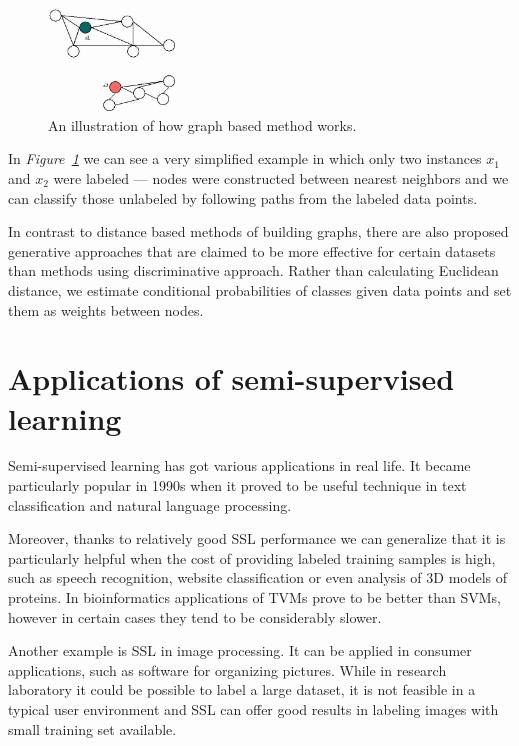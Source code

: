 \documentclass[12pt, a4paper, pdflatex]{report}
\begin{document}
\begin{figure}[htbp]
\centering
\includegraphics[width=0.3\textwidth]{graphics/graph-methods.jpg}
\begin{tiny}
\caption{ An illustration of how graph based method works.\label{fig:GraphMethodFig}}
\end{tiny}
\vspace{1cm}
\end{figure}

In \emph{Figure~\ref{fig:GraphMethodFig}} we can see a very simplified example in which only two instances $x_1$ and $x_2$ were labeled --- nodes were constructed between nearest neighbors and we can classify those unlabeled by following paths from the labeled data points.

In contrast to distance based methods of building graphs, there are also proposed generative approaches that are claimed to be more effective for certain datasets than methods using discriminative approach\cite{He07}. Rather than calculating Euclidean distance, we estimate conditional probabilities of classes given data points and set them as weights between nodes.

\section{Applications of semi-supervised learning}

Semi-supervised learning has got various applications in real life. It became particularly popular in 1990s when it proved to be useful technique in text classification and natural language processing\cite{chapelle06}. 

Moreover, thanks to relatively good SSL performance we can generalize that it is particularly helpful when the cost of providing labeled training samples is high, such as speech recognition, website classification or even analysis of 3D models of proteins. In bioinformatics applications of TVMs prove to be better than SVMs, however in certain cases they tend to be considerably slower\cite{chapelle06}.
 
Another example is SSL in image processing. It can be applied in consumer applications, such as software for organizing pictures. While in research laboratory it could be possible to label a large dataset, it is not feasible in a typical user environment and SSL can offer good results in labeling images with small training set available\cite{Guillaumin10}.
\end{document}
